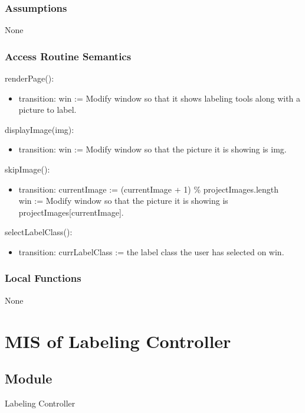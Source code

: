 \documentclass[12pt, titlepage]{article}
\begin{document}
\subsubsection{Assumptions}
None

\subsubsection{Access Routine Semantics}

\noindent renderPage():
\begin{itemize}
\item transition: win := Modify window so that it shows labeling tools along with a picture to label.
\end{itemize}

\noindent displayImage(img):
\begin{itemize}
\item transition: win := Modify window so that the picture it is showing is img.
\end{itemize}

\noindent skipImage():
\begin{itemize}
\item transition: 
currentImage := (currentImage + 1) \% projectImages.length \\
win := Modify window so that the picture it is showing is projectImages[currentImage].

\end{itemize}

\noindent selectLabelClass():
\begin{itemize}
\item transition: currLabelClass := the label class the user has selected on win.
\end{itemize}

\subsubsection{Local Functions}
None

\section{MIS of Labeling Controller} \label{lc}

\subsection{Module}

Labeling Controller
\end{document}
